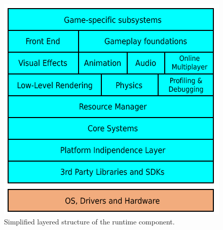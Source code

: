 \begin{figure}
	\centering
	\includegraphics[width=0.60\linewidth]{immagini/State-of-the-art/runtime-component.png}
	\caption[Simplified layered structure of the runtime component.]{Simplified layered structure of the runtime component.}
	\label{fig:runtime-component}
\end{figure}


